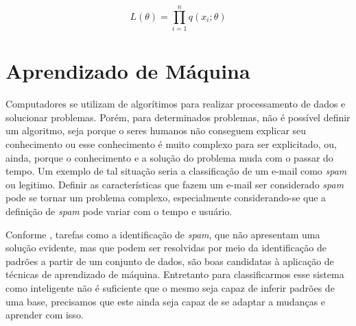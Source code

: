 \documentclass[
    12pt,
    oneside,
    a4paper,
    english,
    brazil
]{abntex2}
\begin{document}
\begin{equation}\label{eq:likelihood}
    L(\theta) = \prod_{i=1}^{n}{q(x_i;\theta)}
\end{equation}


\section{Aprendizado de Máquina}

Computadores se utilizam de algorítimos  para realizar processamento de dados e
solucionar  problemas.  Porém,  para  determinados problemas,  não  é  possível
definir um  algoritmo, seja porque o  seres humanos não conseguem  explicar seu
conhecimento ou  esse conhecimento é  muito complexo para ser  explicitado, ou,
ainda, porque  o conhecimento  e a  solução do  problema muda  com o  passar do
tempo.  Um exemplo  de tal  situação seria  a classificação  de um  e-mail como
\textit{spam} ou legitimo.  Definir as características que fazem  um e-mail ser
considerado \textit{spam}  pode se  tornar um problema  complexo, especialmente
considerando-se que  a definição  de \textit{spam}  pode variar  com o  tempo e
usuário.

Conforme , tarefas como a identificação de \textit{spam}, que
não apresentam  uma solução  evidente, mas  que podem  ser resolvidas  por meio
da  identificação  de padrões  a  partir  de um  conjunto  de  dados, são  boas
candidatas à aplicação  de técnicas de aprendizado de  máquina. Entretanto para
classificarmos esse sistema como inteligente não  é suficiente que o mesmo seja
capaz de inferir padrões  de uma base, precisamos que este  ainda seja capaz de
se adaptar a mudanças e aprender com isso.
\end{document}
